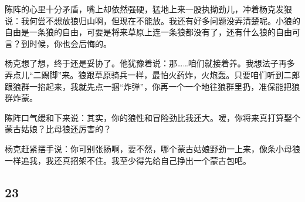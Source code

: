 \par 陈阵的心里十分矛盾，嘴上却依然强硬，猛地上来一股执拗劲儿，冲着杨克发狠说：我何尝不想放狼归山啊，但现在不能放。我还有好多问题没弄清楚呢。小狼的自由是一条狼的自由，可要是将来草原上连一条狼都没有了，还有什么狼的自由可言？到时候，你也会后悔的。
\par 杨克想了想，终于还是妥协了。他犹豫着说：那……咱们就接着养。我想法子再多弄点儿“二踢脚”来。狼跟草原骑兵一样，最怕火药炸，火炮轰。只要咱们听到二郎跟狼群一掐起来，我就先点一捆“炸弹”，你再一个一个地往狼群里扔，准保能把狼群炸蒙。
\par 陈阵口气缓和下来说：其实，你的狼性和冒险劲比我还大。嗳，你将来真打算娶个蒙古姑娘？比母狼还厉害的？
\par 杨克赶紧摆手说：你可别张扬啊，要不然，哪个蒙古姑娘野劲一上来，像条小母狼一样追我，我还真招架不住。我至少得先给自己挣出一个蒙古包吧。


\subsection*{23}


